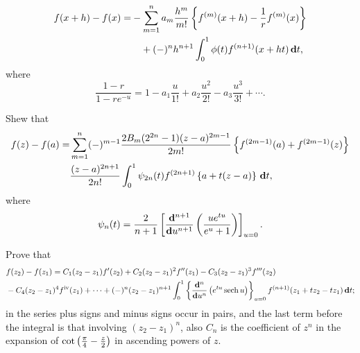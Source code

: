 \begin{wandwmiscexamples}
\begin{wandwmiscexample}
\begin{align*}
      f(x+h) - f(x)
      =&
      -
      \sum_{m=1}^{n}
      a_{m}
      \frac{h^{m}}{m!}
      \left\{ 
        f^{(m)}(x+h) - \frac{1}{r} f^{(m)}(x)
       \right\}
      \\
      & \quad
      +
      (-)^{n} h^{n+1}
      \int_{0}^{1}
      \phi(t) f^{(n+1)}(x+ht) \, \mathbf{d} t,
    \end{align*}
    where
    $$
    \frac{1-r}{1 - r e^{-u}}
    =
    1
    -
    a_{1} \frac{u}{1!}
    +
    a_{2} \frac{u^{2}}{2!}
    -
    a_{3} \frac{u^{3}}{3!}
    +
    \cdots.
    $$
  \end{wandwmiscexample}
  \begin{wandwmiscexample}
    Shew that
    \begin{align*}
      f(z) - f(a)
      =&
      \sum_{m=1}^{n}
      (-)^{m-1}
      \frac{2 B_{m} (2^{2n} - 1)(z-a)^{2m-1}}{2m!}
      \thebrace{
        f^{(2m-1)}(a)
        +
        f^{(2m-1)}(z)
      }
      \\
      &
      \hfill
      \frac{(z-a)^{2n+1}}{2n!}
      \int_{0}^{1}
      \psi_{2n}(t)
      f^{(2n+1)}\thebrace{
        a + t(z-a)
      }
      \dmeasure t,
    \end{align*}
    where
    $$
    \psi_{n}(t)
    =
    \frac{2}{n+1}
    \left[ 
      \frac{\mathbf{d}^{n+1}}{\mathbf{d} u^{n+1}}
      \left( 
        \frac{u e^{tu}}{e^{u} + 1}
       \right)
     \right]_{u=0}.
    $$
  \end{wandwmiscexample}
  \begin{wandwmiscexample}
    Prove that
    \begin{align*}
      &
      f(z_{2}) - f(z_{1})
      =
      C_{1} (z_{2} - z_{1}) f'(z_{2})
      +
      C_{2} (z_{2} - z_{1})^{2} f''(z_{1})
      -
      C_{3} (z_{2} - z_{1})^{3} f'''(z_{2})
      \\
      &
      -C_{4} (z_{2}-z_{1})^{4} f^{\textrm{iv}}(z_{1})
      +
      \cdots
      +
      (-)^{n} (z_{2} - z_{1})^{n+1}
      \int_{0}^{1}
      \left\{ 
        \frac{\mathbf{d}^{n}}{\mathbf{d} u^{n}}
        \left( 
          e^{tu} \operatorname{sech} u
         \right)
       \right\}_{u=0}
      f^{(n+1)}(z_{1} + t z_{2} - t z_{1})
      \, \mathbf{d} t;
    \end{align*}
    in the series plus signs and minus signs occur in pairs, and the last
    term before the integral is that involving
    $(z_{2}-z_{1})^{n}$, also $C_{n}$ is the
    coefficient of $z^{n}$ in the expansion of
    $\cot\left( \frac{\pi}{4} - \frac{z}{2} \right)$
    in ascending powers of $z$. 
  \end{wandwmiscexample}

\end{wandwmiscexamples}
